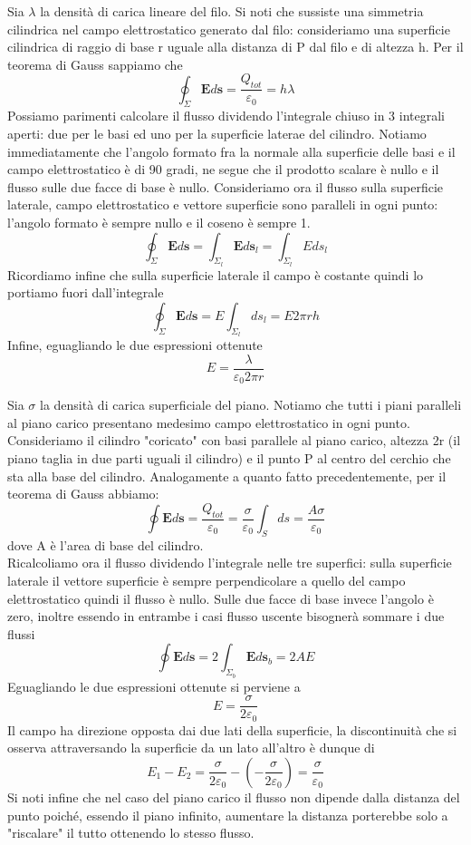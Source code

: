 \documentclass[
10pt, %
a4paper, %
oneside, %
headinclude,footinclude, %
BCOR5mm, %
]{scrartcl}
\begin{document}
\begin{esercizio}
Sia $\lambda$ la densità di carica lineare del filo. Si noti che sussiste una simmetria cilindrica nel campo elettrostatico generato dal filo: consideriamo una superficie cilindrica di raggio di base r uguale alla distanza di P dal filo e di altezza h. Per il teorema di Gauss sappiamo che
\[\oint_{\Sigma}\mathbf{E}d\mathbf{s}=\frac{Q_{tot}}{\varepsilon_0} = h\lambda\]
Possiamo parimenti calcolare il flusso dividendo l'integrale chiuso in 3 integrali aperti: due per le basi ed uno per la superficie laterae del cilindro. Notiamo immediatamente che l'angolo formato fra la normale alla superficie delle basi e il campo elettrostatico è di 90 gradi, ne segue che il prodotto scalare è nullo e il flusso sulle due facce di base è nullo. Consideriamo ora il flusso sulla superficie laterale, campo elettrostatico e vettore superficie sono paralleli in ogni punto: l'angolo formato è sempre nullo e il coseno è sempre 1.
\[\oint_{\Sigma}\mathbf{E}d\mathbf{s}=\int_{\Sigma_l}\mathbf{E}d\mathbf{s}_l= \int_{\Sigma_l}Eds_l\]
Ricordiamo infine che sulla superficie laterale il campo è costante quindi lo portiamo fuori dall'integrale
\[\oint_{\Sigma}\mathbf{E}d\mathbf{s}=E\int_{\Sigma_l}ds_l=E 2\pi r h\]
Infine, eguagliando le due espressioni ottenute
\[E= \frac{\lambda}{\varepsilon_0 2\pi r }\]
\end{esercizio}
\begin{esercizio}\label{:campo_piano_infinito}
Sia $\sigma$ la densità di carica superficiale del piano. Notiamo che tutti i piani paralleli al piano carico presentano medesimo campo elettrostatico in ogni punto. Consideriamo il cilindro "coricato" con basi parallele al piano carico, altezza 2r (il piano taglia in due parti uguali il cilindro) e il punto P al centro del cerchio che sta alla base del cilindro. Analogamente a quanto fatto precedentemente, per il teorema di Gauss abbiamo:
\[\oint\mathbf{E}d\mathbf{s} = \frac{Q_{tot}}{\varepsilon_0}=\frac{\sigma}{\varepsilon_0}\int_Sds=\frac{A\sigma}{\varepsilon_0}\]
dove A è l'area di base del cilindro.\\
Ricalcoliamo ora il flusso dividendo l'integrale nelle tre superfici: sulla superficie laterale il vettore superficie è sempre perpendicolare a quello del campo elettrostatico quindi il flusso è nullo. Sulle due facce di base invece l'angolo è zero, inoltre essendo in entrambe i casi flusso uscente bisognerà sommare i due flussi
  \[\oint\mathbf{E}d\mathbf{s} = 2\int_{\Sigma_b}\mathbf{E}d\mathbf{s}_b= 2AE\]
Eguagliando le due espressioni ottenute si perviene a 
\[E=\frac{\sigma}{2\varepsilon_0}\]
Il campo ha direzione opposta dai due lati della superficie, la discontinuità che si osserva attraversando la superficie da un lato all'altro è dunque di
\[E_1-E_2 = \frac{\sigma}{2\varepsilon_0}-\left(-\frac{\sigma}{2\varepsilon_0}\right) = \frac{\sigma}{\varepsilon_0}\]
Si noti infine che nel caso del piano carico il flusso non dipende dalla distanza del punto poiché, essendo il piano infinito, aumentare la distanza porterebbe solo a "riscalare" il tutto ottenendo lo stesso flusso.
\end{esercizio}
\end{document}
